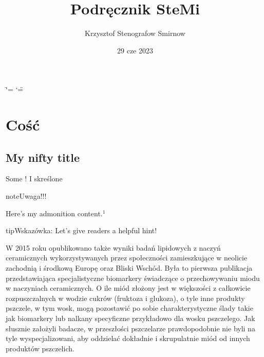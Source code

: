 \documentclass[letterpaper,10pt,polish]{sphinxmanual}
\title{Podręcznik SteMi}
\date{29 cze 2023}
\author{Krzysztof Stenografow Smirnow}
\begin{document}
\ifdefined\shorthandoff
  \ifnum\catcode`\=\string=\active\shorthandoff{=}\fi
  \ifnum\catcode`\"=\active{}\fi
\fi

\pagestyle{empty}
\sphinxmaketitle
\pagestyle{plain}
\sphinxtableofcontents
\pagestyle{normal}
\label{\detokenize{index::doc}}


\sphinxstepscope


\chapter{Cość}
\label{\detokenize{01:cosc}}\label{\detokenize{01::doc}}

\section{My nifty title}
\label{\detokenize{01:my-nifty-title}}
\sphinxAtStartPar
Some ! I skreślone

\begin{sphinxadmonition}{note}{Uwaga!!!}

\sphinxAtStartPar
Here’s my admonition content.$^{\text{1}}$
\end{sphinxadmonition}

\sphinxAtStartPar
{}

\sphinxAtStartPar
{}

\begin{sphinxadmonition}{tip}{Wskazówka:}
\sphinxAtStartPar
Let’s give readers a helpful hint!
\end{sphinxadmonition}

\sphinxAtStartPar
W 2015 roku opublikowano także wyniki badań lipidowych z naczyń ceramicznych wykorzystywanych przez społeczności zamieszkujące w neolicie zachodnią i środkową Europę oraz Bliski Wschód. Była to pierwsza publikacja przedstawiająca specjalistyczne biomarkery świadczące o przechowywaniu miodu w naczyniach ceramicznych. O ile miód złożony jest w większości z całkowicie rozpuszczalnych w wodzie cukrów (fruktoza i glukoza), o tyle inne produkty pszczele, w tym wosk, mogą pozostawić po sobie charakterystyczne ślady takie jak biomarkery lub n\sphinxhyphen{}alkany specyficzne przykładowo dla wosku pszczelego. Jak słusznie założyli badacze, w przeszłości pszczelarze prawdopodobnie nie byli na tyle wyspecjalizowani, aby oddzielać dokładnie i skrupulatnie miód od innych produktów pszczelich.

\sphinxstepscope
\end{document}
